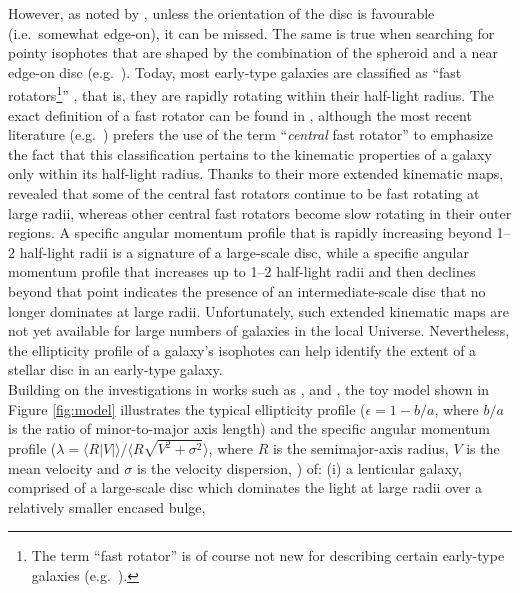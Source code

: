 \documentclass[useAMS,usenatbib,article]{mnras}
\begin{document}
{However, as noted by \cite{nieto1988}, unless the orientation of the disc is favourable 
(i.e.~somewhat edge-on), it can be missed.  
The same is true when searching for pointy isophotes that are shaped by the combination of the spheroid and a near edge-on disc 
(e.g.~\citealt{carter1978,carter1987,jedrzejewski1987,BenderMoellenhoff1987}). 
Today, most early-type galaxies are classified as ``fast rotators\footnote{The term 
``fast rotator'' is of course not new for describing certain early-type galaxies (e.g.~\citealt{bertinstiavelli1984,lakedressler1986}).}'' 
\citep{atlas3dIII,scott2014}, 
that is, they are rapidly rotating within their half-light radius. 
The exact definition of a fast rotator can be found in \cite{emsellem2007}, 
although the most recent literature (e.g.~\citealt{arnold2011n3115,romanowskyfall2012,arnold2014}) 
prefers the use of the term ``\emph{central} fast rotator'' 
to emphasize the fact that this classification pertains to the kinematic properties of a galaxy only within its half-light radius.
Thanks to their more extended kinematic maps, 
\cite{arnold2014} revealed that some of the central fast rotators continue to be fast rotating at large radii, 
whereas other central fast rotators become slow rotating in their outer regions.
A specific angular momentum profile that is rapidly increasing beyond 1--2 half-light radii 
is a signature of a large-scale disc, 
while a specific angular momentum profile that increases up to 1--2 half-light radii and then declines beyond that point 
indicates the presence of an intermediate-scale disc that no longer dominates at large radii. 
Unfortunately, such extended kinematic maps are not yet available for large numbers of galaxies in the local Universe. 
Nevertheless, the ellipticity profile of a galaxy's isophotes can help identify the extent of a stellar disc in an early-type galaxy. \\
Building on the investigations in works such as \cite{liller1966}, \cite{Jedrzejewski1987INPROCEEDINGS} and \cite{rixwhite1990}, 
the toy model shown in Figure \ref{fig:model} illustrates the typical ellipticity profile 
($\epsilon = 1 - b/a$, where $b/a$ is the ratio of minor-to-major axis length) 
and the specific angular momentum profile 
($\lambda = \langle R |V| \rangle / \langle R \sqrt{V^2 + \sigma^2} \rangle$, 
where $R$ is the semimajor-axis radius, $V$ is the mean velocity and $\sigma$ is the velocity dispersion, \citealt{emsellem2007}) 
of: 
(i) a lenticular galaxy, 
comprised of a large-scale disc which dominates the light at large radii over a relatively smaller encased bulge,  
}
\end{document}
